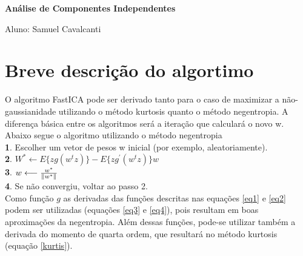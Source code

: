 \documentclass[a4paper, 12pt]{article}
\begin{document}


	\begin{center}
	
		\vspace{15pt}
        \vspace{95pt}
        \textbf{\LARGE{Análise de Componentes Independentes}}\\
	
		\vspace{3,5cm}
	\end{center}
	
	\begin{flushleft}
		\begin{tabbing}
			Aluno: Samuel Cavalcanti \\
	\end{tabbing}
 \end{flushleft}





\section{Breve descrição do algortimo}  
O algoritmo FastICA pode ser derivado tanto para o caso de maximizar a não-
gaussianidade utilizando o método kurtosis quanto o método negentropia. A diferença
básica entre os algoritmos será a iteração que calculará o novo w. Abaixo segue o algoritmo
utilizando o método negentropia\\
\textbf{1}. Escolher um vetor de pesos w inicial (por exemplo, aleatoriamente). \\
\textbf{2}. $ W^* \longleftarrow  E\{zg(w^tz)\} - E\{zg^{'}(w^tz)\}w $ \\
\textbf{3}. $w \longleftarrow \frac{w^*}{ \Arrowvert  w^*  \Arrowvert }$ \\
\textbf{4}. Se não convergiu, voltar ao passo 2.\\

Como função $g$ as derivadas das funções descritas nas equações \ref{eq1} e \ref{eq2}
podem ser utilizadas (equações \ref{eq3} e \ref{eq4}), pois resultam em boas aproximações da
negentropia. Além dessas funções, pode-se utilizar também a derivada do momento de
quarta ordem, que resultará no método kurtosis (equação \ref{kurtis}).
\end{document}
